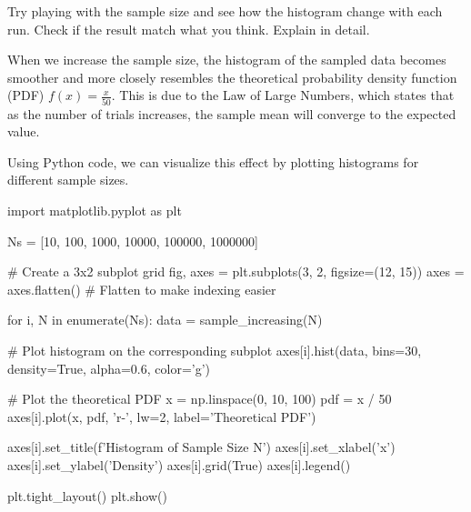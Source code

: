 \documentclass[a4paper, 10pt]{article}
\begin{document}
\newpage

\begin{problem}[0]
Try playing with the sample size and see how the histogram change with each run.
Check if the result match what you think. Explain in detail.
\end{problem}

\begin{solution}
When we increase the sample size, the histogram of the sampled data becomes smoother
and more closely resembles the theoretical probability density function (PDF) \( f(x) = \frac{x}{50} \).
This is due to the Law of Large Numbers, which states that as the number of trials increases,
the sample mean will converge to the expected value.

Using Python code, we can visualize this effect by plotting histograms for different sample sizes.
\begin{codingbox}
import matplotlib.pyplot as plt

Ns = [10, 100, 1000, 10000, 100000, 1000000]

# Create a 3x2 subplot grid
fig, axes = plt.subplots(3, 2, figsize=(12, 15))
axes = axes.flatten()  # Flatten to make indexing easier

for i, N in enumerate(Ns):
    data = sample_increasing(N)
    
    # Plot histogram on the corresponding subplot
    axes[i].hist(data, bins=30, density=True, alpha=0.6, color='g')

    # Plot the theoretical PDF
    x = np.linspace(0, 10, 100)
    pdf = x / 50
    axes[i].plot(x, pdf, 'r-', lw=2, label='Theoretical PDF')

    axes[i].set_title(f'Histogram of Sample Size {N}')
    axes[i].set_xlabel('x')
    axes[i].set_ylabel('Density')
    axes[i].grid(True)
    axes[i].legend()

plt.tight_layout()
plt.show()
\end{codingbox}

\newpage


\end{solution}
\end{document}
